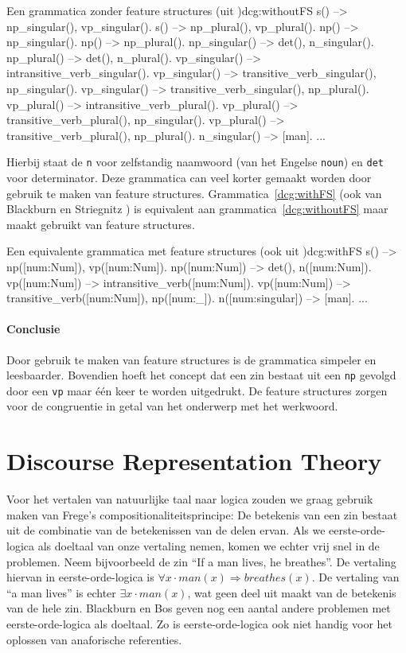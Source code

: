 \begin{dcg}{Een grammatica zonder feature structures (uit \cite{NLPCourse})}{dcg:withoutFS}
s() --> np_singular(), vp_singular().
s() --> np_plural(), vp_plural().
np() --> np_singular().
np() --> np_plural().
np_singular() --> det(), n_singular().
np_plural() --> det(), n_plural().
vp_singular() --> intransitive_verb_singular().
vp_singular() --> transitive_verb_singular(), np_singular().
vp_singular() --> transitive_verb_singular(), np_plural().
vp_plural() --> intransitive_verb_plural().
vp_plural() --> transitive_verb_plural(), np_singular().
vp_plural() --> transitive_verb_plural(), np_plural().
n_singular() --> [man].
...
\end{dcg}
Hierbij staat de \texttt{n} voor zelfstandig naamwoord (van het Engelse \texttt{noun}) en \texttt{det} voor determinator. Deze grammatica can veel korter gemaakt worden door gebruik te maken van feature structures. Grammatica~\ref{dcg:withFS} (ook van Blackburn en Striegnitz \cite{NLPCourse}) is equivalent aan grammatica~\ref{dcg:withoutFS} maar maakt gebruikt van feature structures.

\begin{dcg}{Een equivalente grammatica met feature structures (ook uit \cite{NLPCourse})}{dcg:withFS}
s() --> np([num:Num]), vp([num:Num]).
np([num:Num]) --> det(), n([num:Num]).
vp([num:Num]) --> intransitive_verb([num:Num]).
vp([num:Num]) --> transitive_verb([num:Num]), np([num:_]).
n([num:singular]) --> [man].
...
\end{dcg} 

\paragraph{Conclusie} Door gebruik te maken van feature structures is de grammatica simpeler en leesbaarder. Bovendien hoeft het concept dat een zin bestaat uit een \texttt{np} gevolgd door een \texttt{vp} maar \'e\'en keer te worden uitgedrukt. De feature structures zorgen voor de congruentie in getal van het onderwerp met het werkwoord. 

\section{Discourse Representation Theory}
Voor het vertalen van natuurlijke taal naar logica zouden we graag gebruik maken van Frege's compositionaliteitsprincipe: De betekenis van een zin bestaat uit de combinatie van de betekenissen van de delen ervan. Als we eerste-orde-logica als doeltaal van onze vertaling nemen, komen we echter vrij snel in de problemen. Neem bijvoorbeeld de zin ``If a man lives, he breathes''. De vertaling hiervan in eerste-orde-logica is $\forall x \cdot man(x) \Rightarrow breathes(x)$. De vertaling van ``a man lives'' is echter $\exists x \cdot man(x)$, wat geen deel uit maakt van de betekenis van de hele zin. Blackburn en Bos \cite{Blackburn2006} geven nog een aantal andere problemen met eerste-orde-logica als doeltaal. Zo is eerste-orde-logica ook niet handig voor het oplossen van anaforische referenties.

